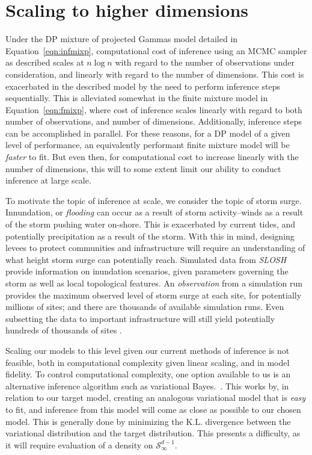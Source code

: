 \section{Scaling to higher dimensions}
\label{sec:scale}
Under the DP mixture of projected Gammas model detailed in Equation~\ref{eqn:infmixp}, computational
  cost of inference using an MCMC sampler as described scales at $n\log n$ with regard to the number
  of observations under consideration, and linearly with regard to the number of dimensions.  This cost
  is exacerbated in the described model by the need to perform inference steps sequentially.  This is
  alleviated somewhat in the finite mixture model in Equation~\ref{eqn:fmixp}, where cost of inference scales
  linearly with regard to both number of observations, and number of dimensions.  Additionally, inference
  steps can be accomplished in parallel.  For these reasons, for a DP model of a given level of performance,
  an equivalently performant finite mixture model will be \emph{faster} to fit.  But even then, for
  computational cost to increase linearly with the number of dimensions, this will to some extent limit
  our ability to conduct inference at large scale.

To motivate the topic of inference at scale, we consider the topic of storm surge.  Innundation, or
  \emph{flooding} can occur as a result of storm activity--winds as a result of the storm pushing water
  on-shore.  This is exacerbated by current tides, and potentially precipitation as a result of the storm.
  With this in mind, designing levees to protect communities and infrastructure will require an
  understanding of what height storm surge can potentially reach.  Simulated data from
  \emph{SLOSH}~\citep{jelesnianski1992} provide information on inundation scenarios, given parameters
  governing the storm as well as local topological features.  An \emph{observation} from a simulation
  run provides the maximum observed level of storm surge at each site, for potentially millions of sites;
  and there are thousands of available simulation runs.  Even subsetting the data to important
  infrastructure will still yield potentially hundreds of thousands of sites \citep{hutchings2021}.

Scaling our models to this level given our current methods of inference is not feasible, both in
  computational complexity given linear scaling, and in model fidelity.   To control computational
  complexity, one option available to us is an alternative inference algorithm such as variational
  Bayes.~\cite{green2015}.  This works by, in relation to our target model, creating an analogous
  variational model that is \emph{easy} to fit, and inference from this model will come as close as
  possible to our chosen model.  This is generally done by minimizing the K.L. divergence between
  the variational distribution and the target distribution.  This presents a difficulty, as it will
  require evaluation of a density on $\mathcal{S}_{\infty}^{d-1}$.

